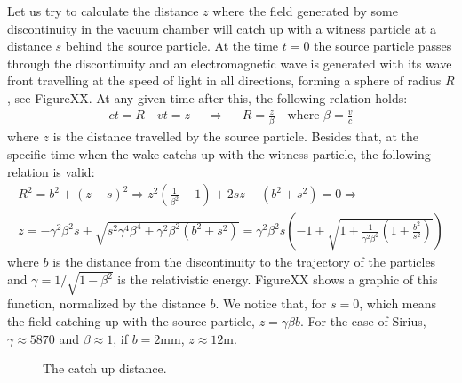 \begin{apendicesenv}
    Let us try to calculate the distance $z$ where the field generated by some discontinuity in the vacuum chamber will catch up with a witness particle at a distance $s$ behind the source particle. At the time $t=0$ the source particle passes through the discontinuity and an electromagnetic wave is generated with its wave front travelling at the speed of light in all directions, forming a sphere of radius $R$, see FigureXX. At any given time after this, the following relation holds:
    \begin{align}
		ct = R \quad vt = z && \Rightarrow && R = \frac{z}{\beta} \quad \text{where} \,\, \beta = \frac{v}{c}
    \end{align}
    where $z$ is the distance travelled by the source particle. Besides that, at the specific time when the wake catchs up with the witness particle, the following relation is valid:
    \begin{align}
		R^2 = b^2 + (z-s)^2  \Rightarrow z^2(\frac{1}{\beta^2}-1) + 2sz - (b^2 + s^2) = 0  \Rightarrow \\
		z = -\gamma^2 \beta^2 s + \sqrt{s^2\gamma^4\beta^4 + \gamma^2\beta^2\left(b^2 + s^2\right)}  = \gamma^2 \beta^2 s\left(-1 + \sqrt{1 + \frac{1}{\gamma^2\beta^2}\left(1 + \frac{b^2}{s^2}\right)}\right)
    \end{align}
    where $b$ is the distance from the discontinuity to the trajectory of the particles and $\gamma = 1/\sqrt{1-\beta^2}$ is the relativistic energy. FigureXX shows a graphic of this function, normalized by the distance $b$. We notice that, for $s=0$, which means the field catching up with the source particle, $z = \gamma\beta b$. For the case of Sirius, $\gamma \approx 5870$ and $\beta \approx 1$, if $ b = 2$mm, $z \approx 12$m.

    \begin{figure}
	    \centering
	    \label{fig:catch_up}
	    \caption{The catch up distance.}
    \end{figure}



\end{apendicesenv}
